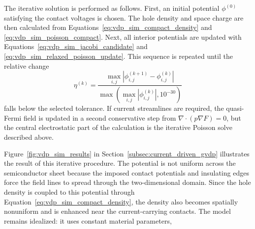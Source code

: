 \begin{appendix}
The iterative solution is performed as follows. First, an initial potential
$\phi^{(0)}$ satisfying the contact voltages is chosen. The hole density and
space charge are then calculated from
Equations~\eqref{eq:vdp_sim_compact_density} and
\eqref{eq:vdp_sim_poisson_compact}. Next, all interior potentials are updated
with Equations~\eqref{eq:vdp_sim_jacobi_candidate} and
\eqref{eq:vdp_sim_relaxed_poisson_update}. This sequence is repeated until the
relative change
\begin{equation}
    \eta^{(k)}
    =\frac{\max_{i,j}|\phi^{(k+1)}_{i,j}-\phi^{(k)}_{i,j}|}
    {\max\left(\max_{i,j}|\phi^{(k)}_{i,j}|,10^{-30}\right)}
    \label{eq:vdp_sim_convergence_compact}
\end{equation}
falls below the selected tolerance. If current streamlines are required, the
quasi-Fermi field is updated in a second conservative step from
$\nabla\cdot(p\nabla F)=0$, but the central electrostatic part of the calculation
is the iterative Poisson solve described above.

Figure~\ref{fig:vdp_sim_results} in Section~\ref{subsec:current_driven_gvdp}
illustrates the result of this iterative procedure. The potential is not uniform across the semiconductor sheet because
the imposed contact potentials and insulating edges force the field lines to
spread through the two-dimensional domain. Since the hole density is coupled to
this potential through Equation~\eqref{eq:vdp_sim_compact_density}, the density
also becomes spatially nonuniform and is enhanced near the current-carrying
contacts. The model remains idealized: it uses constant material parameters,

\end{appendix}
